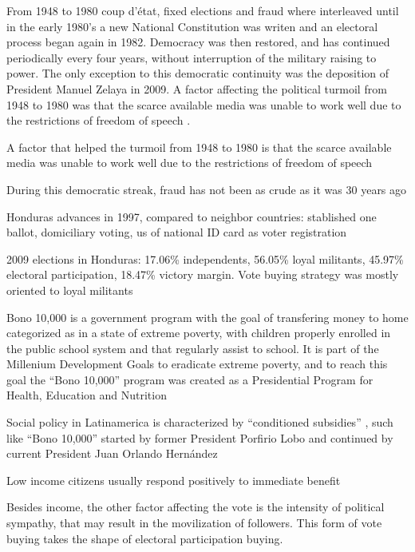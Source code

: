 \documentclass[a4paper,10pt]{article}
\begin{document}
From 1948 to 1980 coup d'\'{e}tat, fixed elections and fraud where interleaved until in the early 1980's a new National Constitution was writen and an electoral process began again in 1982. Democracy was then restored, and has continued periodically every four years, without interruption of the military raising to power. The only exception to this democratic continuity was the deposition of President Manuel Zelaya in 2009. A factor affecting the political turmoil from 1948 to 1980 was that the scarce available media was unable to work well due to the restrictions of freedom of speech \citep{romero2014}.





A factor that helped the turmoil from 1948 to 1980 is that the scarce available media was unable to work well due to the restrictions of freedom of speech \citep{romero2014}

During this democratic streak, fraud has not been as crude as it was 30 years ago \citep{romero2014}


Honduras advances in 1997, compared to neighbor countries: stablished one ballot, domiciliary voting, us of national ID card as voter registration \citep{romero2014}

2009 elections in Honduras: 17.06\% independents, 56.05\% loyal militants, 45.97\% electoral participation, 18.47\% victory margin. Vote buying strategy was mostly oriented to loyal militants \citep{gonza2014}


Bono 10,000 is a government program with the goal of transfering money to home categorized as in a state of extreme poverty, with children properly enrolled in the public school system and that regularly assist to school. It is part of the Millenium Development Goals \citep{mdg2006} to eradicate extreme poverty, and to reach this goal the ``Bono 10,000'' program was created as a Presidential Program for Health, Education and Nutrition \citep{bono10k}

Social policy in Latinamerica is characterized by ``conditioned subsidies'' \citep{romero2014}, such like ``Bono 10,000'' started by former President Porfirio Lobo and continued by current President Juan Orlando Hern\'{a}ndez

Low income citizens usually respond positively to immediate benefit \citep{kit2000}

Besides income, the other factor affecting the vote is the intensity of political sympathy, that may result in the movilization of followers. This form of vote buying takes the shape of electoral participation buying.
\end{document}
